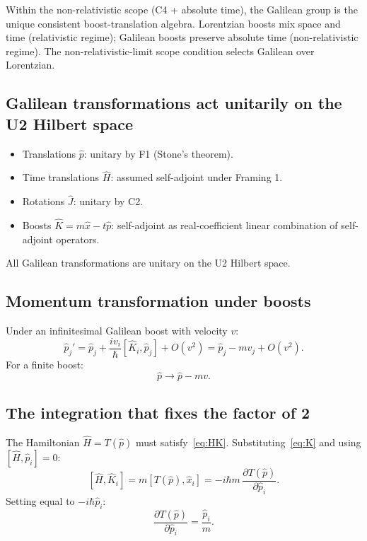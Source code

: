 \documentclass[11pt,a4paper]{article}
\begin{document}
Within the non-relativistic scope (C4 + absolute time), the Galilean group is the unique consistent boost-translation algebra. Lorentzian boosts mix space and time (relativistic regime); Galilean boosts preserve absolute time (non-relativistic regime). The non-relativistic-limit scope condition selects Galilean over Lorentzian.

\subsection{Galilean transformations act unitarily on the U2 Hilbert space}

\begin{itemize}
  \item Translations $\hat{p}$: unitary by F1 (Stone's theorem).
  \item Time translations $\hat{H}$: assumed self-adjoint under Framing 1.
  \item Rotations $\hat{J}$: unitary by C2.
  \item Boosts $\hat{K} = m \hat{x} - t \hat{p}$: self-adjoint as real-coefficient linear combination of self-adjoint operators.
\end{itemize}
All Galilean transformations are unitary on the U2 Hilbert space.

\subsection{Momentum transformation under boosts}

Under an infinitesimal Galilean boost with velocity $v$:
\[
\hat{p}_j' = \hat{p}_j + \frac{i v_i}{\hbar} [\hat{K}_i, \hat{p}_j] + O(v^2) = \hat{p}_j - m v_j + O(v^2).
\]
For a finite boost:
\begin{equation}
\hat{p} \to \hat{p} - m v. \label{eq:p-boost}
\end{equation}

\subsection{The integration that fixes the factor of 2}

The Hamiltonian $\hat{H} = T(\hat{p})$ must satisfy~\eqref{eq:HK}. Substituting~\eqref{eq:K} and using $[\hat{H}, \hat{p}_i] = 0$:
\[
[\hat{H}, \hat{K}_i] = m [T(\hat{p}), \hat{x}_i] = -i \hbar m \, \frac{\partial T(\hat{p})}{\partial \hat{p}_i}.
\]
Setting equal to $-i\hbar \hat{p}_i$:
\begin{equation}
\frac{\partial T(\hat{p})}{\partial \hat{p}_i} = \frac{\hat{p}_i}{m}. \label{eq:Tprime}
\end{equation}
\end{document}
